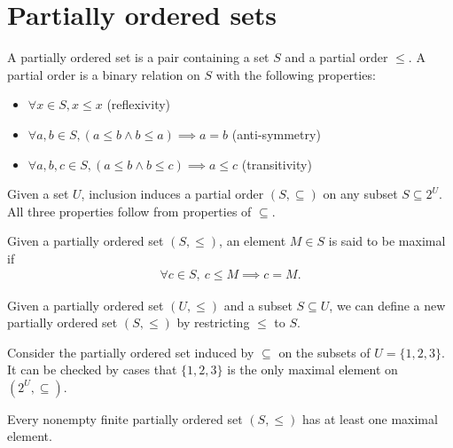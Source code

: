 \newpage
\section{Partially ordered sets}\label{sec:appendix-poset}

\begin{defn}
 A partially ordered set is a pair containing a set $S$ and a partial order $\leq$. A partial order is a binary relation on $S$ with the following properties:
 \begin{itemize}
   \item $\forall x \in S, x \leq x$ (reflexivity)
   \item $\forall a, b \in S, (a \leq b \land b \leq a) \implies a = b$ (anti-symmetry)
   \item $\forall a, b, c \in S, (a \leq b \land b \leq c) \implies a \leq c$ (transitivity)
 \end{itemize}
 \end{defn}

 \begin{exmp}
   Given a set $U$, inclusion induces a partial order $(S, \subseteq )$ on any subset $S \subseteq 2 ^{U}$. All three properties follow from properties of $\subseteq $.
 \end{exmp}

 \begin{defn}
   Given a partially ordered set $(S, \leq )$, an element $M \in S$ is said to be maximal if 
   \begin{align*}
    \forall c \in S,\: c \leq M \implies c = M.
   \end{align*}
 \end{defn}

 \begin{remark}\label{rem:subsets-of-poset-are-posets}
   Given a partially ordered set $(U, \leq )$ and a subset $S \subseteq U$, we can define a new partially ordered set $(S, \leq )$ by restricting $\leq$ to $S$.
 \end{remark}

 \begin{exmp}
   Consider the partially ordered set induced by $\subseteq$ on the subsets of $U = \{1, 2, 3\}$. It can be checked by cases that $\{1, 2, 3\}$ is the only maximal element on $(2 ^U, \subseteq )$.
 \end{exmp}

 \begin{lemma}\label{lem:nonempty-finite-posets-have-maximal-elements}
   Every nonempty finite partially ordered set $(S, \leq )$ has at least one maximal element. 
 \end{lemma}

